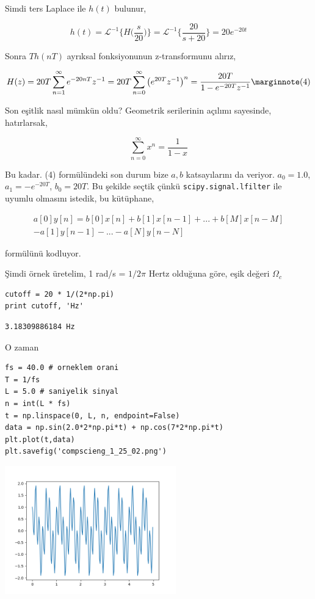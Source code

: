 \documentclass[12pt,fleqn]{article}\usepackage{../../common}
\begin{document}
Simdi ters Laplace ile $h(t)$ bulunur, 

$$ 
h(t) = \mathcal{L}^{-1} \bigg\{ H\bigg( \frac{s}{20} \bigg)  \bigg\} 
= \mathcal{L}^{-1} \bigg\{ \frac{20}{s + 20}  \bigg\}  
= 20 e^{-20 t}
$$

Sonra $Th(nT)$ ayrıksal fonksiyonunun z-transformunu alırız, 

$$
H(z) = 20 T \sum _{n=1}^{\infty} e^{-20 nT}z^{-1} 
= 20 T \sum _{n=0}^{\infty} \big( e^{20 T}z^{-1} \big)^n
= \frac{20T}{1 - e^{-20 T}z^{-1}} 
\mlabel{4}
$$

Son eşitlik nasıl mümkün oldu? Geometrik serilerinin açılımı sayesinde,
hatırlarsak, 

$$ \sum _{n=0}^{\infty} x^n = \frac{1}{1-x} $$

Bu kadar. (4) formülündeki son durum bize $a,b$ katsayılarını da
veriyor. $a_0 = 1.0$, $a_1=-e^{-20T}$, $b_0 = 20T$. Bu şekilde seçtik çünkü
\verb!scipy.signal.lfilter! ile uyumlu olmasını istedik, bu kütüphane,

\begin{eqnarray*}
a[0]y[n] = b[0]x[n] + b[1]x[n-1] + ... + b[M]x[n-M] \\
                    - a[1]y[n-1] - ... - a[N]y[n-N]
\end{eqnarray*}

formülünü kodluyor. 

Şimdi örnek üretelim, 1 rad/s = $1/2\pi$ Hertz olduğuna göre, eşik değeri
$\Omega_c$

\begin{verbatim}
cutoff = 20 * 1/(2*np.pi) 
print cutoff, 'Hz'
\end{verbatim}

\begin{verbatim}
3.18309886184 Hz
\end{verbatim}

O zaman

\begin{verbatim}
fs = 40.0 # orneklem orani
T = 1/fs
L = 5.0 # saniyelik sinyal
n = int(L * fs) 
t = np.linspace(0, L, n, endpoint=False)
data = np.sin(2.0*2*np.pi*t) + np.cos(7*2*np.pi*t) 
plt.plot(t,data)
plt.savefig('compscieng_1_25_02.png')
\end{verbatim}

\includegraphics[width=20em]{compscieng_1_25_02.png}
\end{document}
